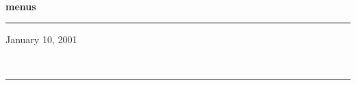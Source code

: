 \documentclass[11pt]{report}
\begin{document}
    \begin{titlepage}

        \vspace*{0.25\textheight}
        \\

\bigskip\noindent
{\Huge\bf menus}\\
        \rule{\textwidth}{1.5mm}
        \begin{flushright}
            January 10, 2001
        \end{flushright}
        \vfill
        \\
        \rule{\textwidth}{0.75mm}
        \vspace*{0.1\textheight}

    \end{titlepage}

    \setcounter{section}{1}
    \vfil\eject
        
        \vfil\eject
        
        \vfil\eject
        
        \vfil\eject
        
        \vfil\eject
        
\end{document}
